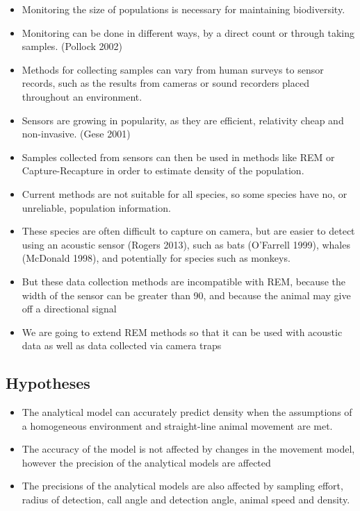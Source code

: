 \documentclass[a4paper,10pt,reqno,oneside]{amsart}
\begin{document}
\begin{itemize}
\item Monitoring the size of populations is necessary for maintaining biodiversity.
\item Monitoring can be done in different ways, by a direct count or through taking samples. (Pollock 2002)
\item Methods for collecting samples can vary from human surveys to sensor records, such as the results from cameras or sound recorders placed throughout an environment. 
\item Sensors are growing in popularity, as they are efficient, relativity cheap and non-invasive. (Gese 2001)
\item Samples collected from sensors can then be used in methods like REM or Capture-Recapture in order to estimate density of the population.
\item Current methods are not suitable for all species, so some species have no, or unreliable, population information. 
\item These species are often difficult to capture on camera, but are easier to detect using an acoustic sensor (Rogers 2013), such as bats (O’Farrell 1999), whales (McDonald 1998), and potentially for species such as monkeys. 
\item But these data collection methods are incompatible with REM, because the width of the sensor can be greater than 90, and because the animal may give off a directional signal 
\item We are going to extend REM methods so that it can be used with acoustic data as well as data collected via camera traps
\end{itemize}

\subsection{Hypotheses}

\begin{itemize}
\item The analytical model can accurately predict density when the assumptions of a homogeneous environment and straight-line animal movement are met.
\item The accuracy of the model is not affected by changes in the movement model, however the precision of the analytical models are affected
\item The precisions of the analytical models are also affected by sampling effort, radius of detection, call angle and detection angle, animal speed and density.
\end{itemize}
\end{document}
